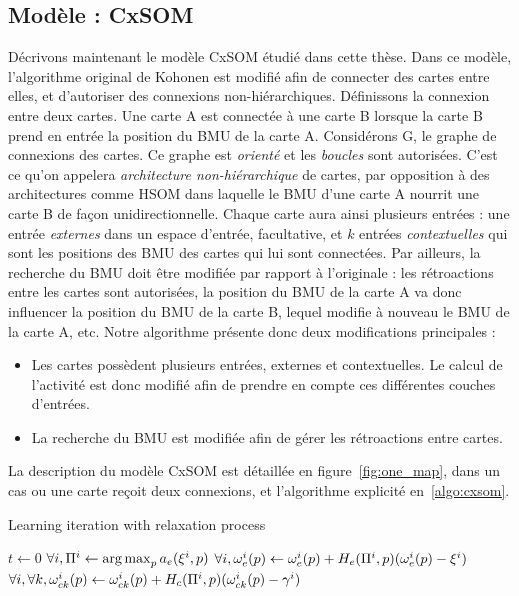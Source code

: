 \subsection{Modèle : CxSOM}

Décrivons maintenant le modèle CxSOM étudié dans cette thèse. Dans ce modèle, l'algorithme original de Kohonen est modifié afin de connecter des cartes entre elles, et d'autoriser des connexions non-hiérarchiques.
Définissons la connexion entre deux cartes. Une carte A est connectée à une carte B lorsque la carte B prend en entrée la position du BMU de la carte A. 
Considérons G, le graphe de connexions des cartes. Ce graphe est \emph{orienté} et les \emph{boucles} sont autorisées. C'est ce qu'on appelera \emph{architecture non-hiérarchique} de cartes, par opposition à des architectures comme HSOM dans laquelle le BMU d'une carte A nourrit une carte B de façon unidirectionnelle. 
Chaque carte aura ainsi plusieurs entrées : une entrée \emph{externes} dans un espace d'entrée, facultative, et $k$ entrées \emph{contextuelles} qui sont les positions des BMU des cartes qui lui sont connectées. Par ailleurs, la recherche du BMU doit être modifiée par rapport à l'originale : les rétroactions entre les cartes sont autorisées, la position du BMU de la carte A va donc influencer la position du BMU de la carte B, lequel modifie à nouveau le BMU de la carte A, etc. 
Notre algorithme présente donc deux modifications principales : 
\begin{itemize}
\item Les cartes possèdent plusieurs entrées, externes et contextuelles. Le calcul de l'activité est donc modifié afin de prendre en compte ces différentes couches d'entrées.
\item La recherche du BMU est modifiée afin de gérer les rétroactions entre cartes.
\end{itemize}

La description du modèle CxSOM est détaillée en figure~\ref{fig:one_map}, dans un cas ou une carte reçoit deux connexions, et l'algorithme explicité en~\ref{algo:cxsom}.

\begin{algorithm}
  \DontPrintSemicolon 
  \caption{Learning iteration with relaxation process}\label{algo:cxsom}
   $t \leftarrow 0$ \;
   $\forall i , \Pi^{i} \leftarrow \operatorname*{arg\,max}_p a_{e}(\xi^{i},p)$\;
  $\forall i, \omega_{e}^{i}(p) \leftarrow \omega_{e}^{i}(p) + H_{e}(\Pi^{i}, p)(\omega_{e}^{i}(p) - \xi^{i})$\;
  $\forall i, \forall k, \omega_{ck}^{i}(p) \leftarrow \omega_{ck}^{i}(p) + H_{c}(\Pi^{i},p)(\omega_{ck}^{i}(p) - \gamma^{i})$
\end{algorithm}
 
